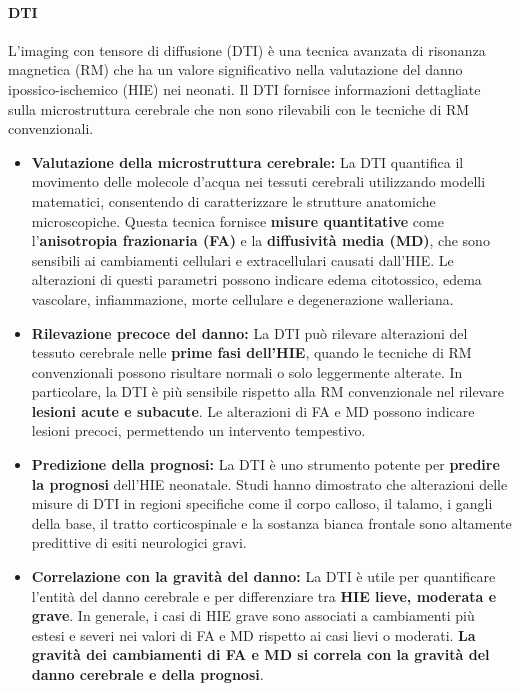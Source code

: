 \paragraph{DTI} L'imaging con tensore di diffusione (DTI) è una tecnica avanzata di risonanza magnetica (RM) che ha un valore significativo nella valutazione del danno ipossico-ischemico (HIE) nei neonati. Il DTI fornisce informazioni dettagliate sulla microstruttura cerebrale che non sono rilevabili con le tecniche di RM convenzionali.

\begin{itemize}
	\item
	\textbf{Valutazione della microstruttura cerebrale:} La DTI quantifica il movimento delle molecole d'acqua nei tessuti cerebrali utilizzando modelli matematici, consentendo di caratterizzare le strutture anatomiche microscopiche. Questa tecnica fornisce \textbf{misure quantitative} come l'\textbf{anisotropia frazionaria (FA)} e la \textbf{diffusività media (MD)}, che sono sensibili ai cambiamenti cellulari e extracellulari causati dall'HIE. Le alterazioni di questi parametri possono indicare edema citotossico, edema vascolare, infiammazione, morte cellulare e degenerazione walleriana.
	\item
	\textbf{Rilevazione precoce del danno:} La DTI può rilevare alterazioni del tessuto cerebrale nelle \textbf{prime fasi dell'HIE}, quando le tecniche di RM convenzionali possono risultare normali o solo leggermente alterate. In particolare, la DTI è più sensibile rispetto alla RM convenzionale nel rilevare \textbf{lesioni acute e subacute}. Le alterazioni di FA e MD possono indicare lesioni precoci, permettendo un intervento tempestivo.
	\item
	\textbf{Predizione della prognosi:} La DTI è uno strumento potente per \textbf{predire la prognosi} dell'HIE neonatale. Studi hanno dimostrato che alterazioni delle misure di DTI in regioni specifiche come il corpo calloso, il talamo, i gangli della base, il tratto corticospinale e la sostanza bianca frontale sono altamente predittive di esiti neurologici gravi.
	\item
	\textbf{Correlazione con la gravità del danno:} La DTI è utile per quantificare l'entità del danno cerebrale e per differenziare tra \textbf{HIE lieve, moderata e grave}. In generale, i casi di HIE grave sono associati a cambiamenti più estesi e severi nei valori di FA e MD rispetto ai casi lievi o moderati. \textbf{La gravità dei cambiamenti di FA e MD si correla con la gravità del danno cerebrale e della prognosi}.
	

\end{itemize}

